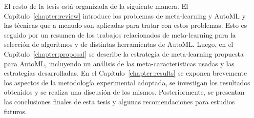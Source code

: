 El resto de la tesis está organizada de la siguiente manera. El Capítulo~\ref{chapter:review} introduce los problemas de meta-learning y AutoML y las técnicas que a menudo son aplicadas para tratar con estos problemas. Esto es seguido por un resumen de los trabajos relacionados de meta-learning para la selección de algoritmos y de distintas herramientas de AutoML. Luego, en el Capítulo~\ref{chapter:proposal} se describe la estrategia de meta-learning propuesta para AutoML, incluyendo un análisis de las meta-características usadas y las estrategias desarrolladas. En el Capítulo~\ref{chapter:results} se exponen brevemente los aspectos de la metodología experimental adoptada, se investigan los resultados obtenidos y se realiza una discusión de los mismos. Posteriormente, se presentan las conclusiones finales de esta tesis y algunas recomendaciones para estudios futuros.